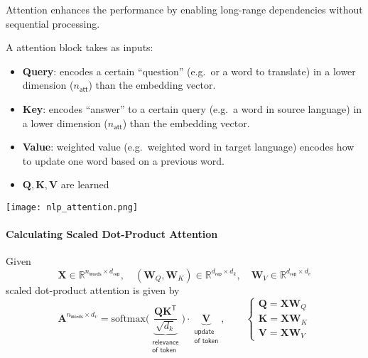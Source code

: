 Attention enhances the performance by enabling long-range dependencies without sequential processing.

\newpar{}
A attention block takes as inputs:
\begin{itemize}
    \item \textbf{Query}: encodes a certain ``question'' (e.g.\ or a word to translate) in a lower dimension ($n_{\mathsf{att}}$) than the embedding vector. %
    \item \textbf{Key}: encodes ``answer'' to a certain query (e.g.\ a word in source language) in a lower dimension ($n_{\mathsf{att}}$) than the embedding vector. %
    \item \textbf{Value}: weighted value (e.g.\ weighted word in target language) encodes how to update one word based on a previous word. %
    \item $\mathbf{Q}, \mathbf{K}, \mathbf{V}$ are learned
\end{itemize}

\newpar{}
\begin{center}
    \texttt{[image: nlp\_attention.png]}
\end{center}

\paragraph{Calculating Scaled Dot-Product Attention}

Given
\noindent\begin{equation*}
    \mathbf{X}\in \mathbb{R}^{n_{\mathsf{words}} \times d_{\mathsf{rep}}},\quad (\mathbf{W}_Q, \mathbf{W}_K)\in \mathbb{R}^{d_{\mathsf{rep}}\times d_k},\quad \mathbf{W}_V\in \mathbb{R}^{d_{\mathsf{rep}}\times d_v}
\end{equation*}
scaled dot-product attention is given by
\noindent\begin{equation*}
    \mathbf{A}^{n_{\mathsf{words}}\times d_v} = \mathrm{softmax}\Biggl(\underbrace{\frac{\mathbf{QK}^{\mathsf{T}}}{\sqrt{d_k}}}_{\substack{\textsf{relevance} \\ \textsf{of token}}}\Biggr)\cdot \underbrace{\mathbf{V}}_{\substack{\textsf{update} \\ \textsf{of token}}},\qquad
    \begin{cases}
        \mathbf{Q} = \mathbf{XW}_Q \\
        \mathbf{K} = \mathbf{XW}_K \\
        \mathbf{V} = \mathbf{XW}_V
    \end{cases}
\end{equation*}

